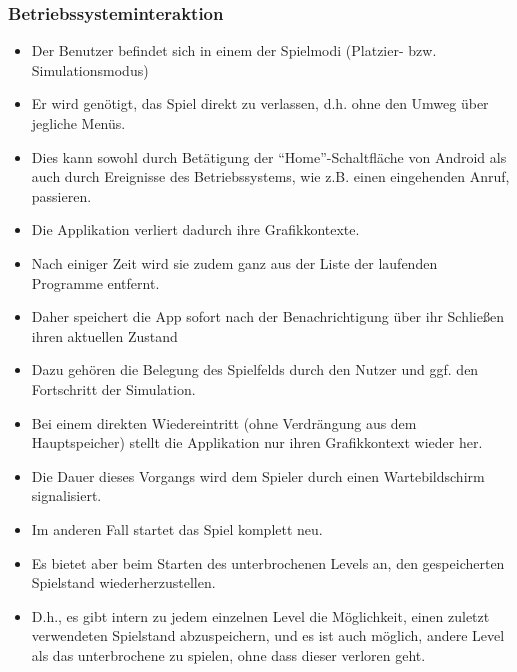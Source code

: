 \subsubsection{Betriebssysteminteraktion}
\begin{itemize}
\item Der Benutzer befindet sich in einem der Spielmodi (Platzier- bzw. 
Simulationsmodus)
\item Er wird genötigt, das Spiel direkt zu verlassen, d.h. ohne den Umweg über jegliche Menüs.
\item Dies kann sowohl durch Betätigung der "`Home"'-Schaltfläche von Android als auch durch
Ereignisse des Betriebssystems, wie z.B. einen eingehenden Anruf, passieren.
\item Die Applikation verliert dadurch ihre Grafikkontexte.
\item Nach einiger Zeit wird sie zudem ganz aus der Liste der laufenden Programme entfernt.
\item Daher speichert die App sofort nach der Benachrichtigung über ihr Schließen ihren aktuellen Zustand
\item Dazu gehören die Belegung des Spielfelds durch den Nutzer und ggf. den Fortschritt der Simulation.
\item Bei einem direkten Wiedereintritt (ohne Verdrängung aus dem Hauptspeicher) stellt die Applikation nur ihren Grafikkontext wieder her.
\item Die Dauer dieses Vorgangs wird dem Spieler durch einen Wartebildschirm signalisiert.
\item Im anderen Fall startet das Spiel komplett neu.
\item Es bietet aber beim Starten des unterbrochenen Levels an, den gespeicherten Spielstand wiederherzustellen. 
\item D.h., es gibt intern zu jedem einzelnen Level die Möglichkeit,
einen zuletzt verwendeten Spielstand abzuspeichern, und es ist auch möglich, andere Level als das
unterbrochene zu spielen, ohne dass dieser verloren geht.
\end{itemize}
